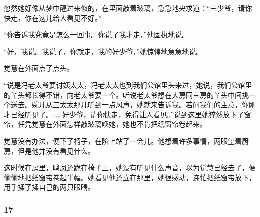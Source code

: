 \par 忽然她好像从梦中醒过来似的，在里面敲着玻璃，急急地央求道：“三少爷，请你快走，你在这儿给人看见不好。”
\par “你告诉我究竟是怎么一回事。你说了我才走，”他固执地说。
\par “好，我说。我说了，你就走，我的好少爷，”她惊惶地急急地说。
\par 觉慧在外面点了点头。
\par “说是冯老太爷要讨姨太太，冯老太太也到我们公馆里头来过，她说，我们公馆里的丫头都长得不错，向老太爷要一个。听说老太爷想在大房同三房的丫头中间挑一个送去。婉儿从三太太那儿听到一点风声，她就来告诉我。若问我们的主意，你刚才已经听见了。……好少爷，请你快走，免得让人看见。”说到这里她猝然放下了窗帘，任凭觉慧在外面怎样敲玻璃唤她，她也不肯把纸窗帘卷起来。
\par 觉慧没有办法，便下了椅子，在阶上站了一会儿。他想着许多事情，两眼望着厨房，但是他并没有看见什么。
\par 这时候在房里，鸣凤还跪在椅子上，她没有听见什么声音，以为觉慧已经去了，便偷偷地把纸窗帘卷起半幅。她看见他还立在那里，她很感动，连忙把纸窗帘放下，用手揉了揉自己的两只眼睛。


\subsubsection*{17}


